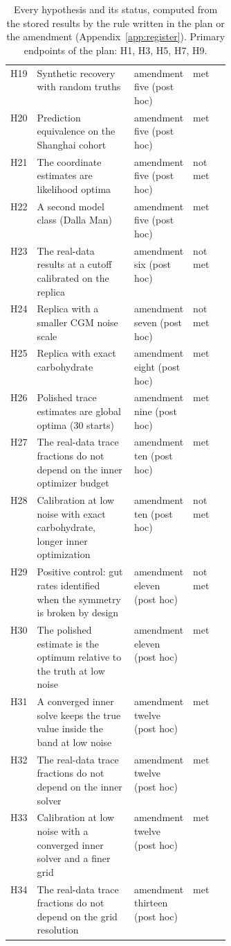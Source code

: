 \begin{table}[t]
\begin{tabularx}{\linewidth}{lXp{0.2\linewidth}p{0.17\linewidth}}
H19 & Synthetic recovery with random truths & amendment five (post hoc) & met \\
H20 & Prediction equivalence on the Shanghai cohort & amendment five (post hoc) & met \\
H21 & The coordinate estimates are likelihood optima & amendment five (post hoc) & not met \\
H22 & A second model class (Dalla Man) & amendment five (post hoc) & met \\
H23 & The real-data results at a cutoff calibrated on the replica & amendment six (post hoc) & not met \\
H24 & Replica with a smaller CGM noise scale & amendment seven (post hoc) & not met \\
H25 & Replica with exact carbohydrate & amendment eight (post hoc) & met \\
H26 & Polished trace estimates are global optima (30 starts) & amendment nine (post hoc) & met \\
H27 & The real-data trace fractions do not depend on the inner optimizer budget & amendment ten (post hoc) & met \\
H28 & Calibration at low noise with exact carbohydrate, longer inner optimization & amendment ten (post hoc) & not met \\
H29 & Positive control: gut rates identified when the symmetry is broken by design & amendment eleven (post hoc) & not met \\
H30 & The polished estimate is the optimum relative to the truth at low noise & amendment eleven (post hoc) & met \\
H31 & A converged inner solve keeps the true value inside the band at low noise & amendment twelve (post hoc) & met \\
H32 & The real-data trace fractions do not depend on the inner solver & amendment twelve (post hoc) & met \\
H33 & Calibration at low noise with a converged inner solver and a finer grid & amendment twelve (post hoc) & met \\
H34 & The real-data trace fractions do not depend on the grid resolution & amendment thirteen (post hoc) & met \\
\bottomrule
\end{tabularx}
\caption{Every hypothesis and its status, computed from the stored results by the rule written in the plan or the amendment (Appendix~\ref{app:register}). Primary endpoints of the plan: H1, H3, H5, H7, H9.}
\label{tab:scorecard}
\end{table}
